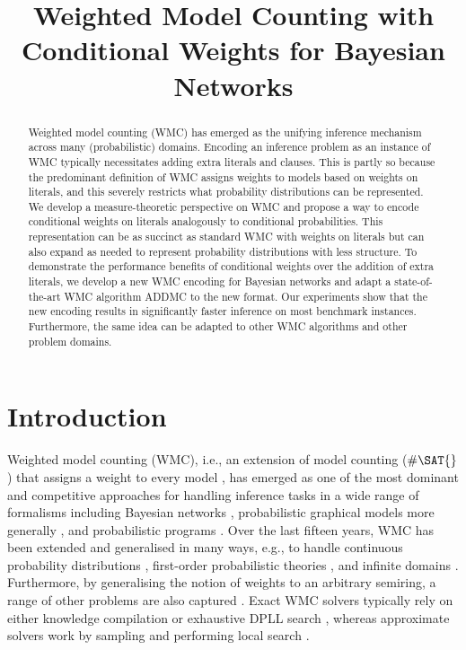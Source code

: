 \documentclass{article}
\title{Weighted Model Counting with Conditional Weights for Bayesian Networks}
\begin{document}
\maketitle

\begin{abstract}
  Weighted model counting (WMC) has emerged as the unifying inference mechanism
  across many (probabilistic) domains. Encoding an inference problem as an
  instance of WMC typically necessitates adding extra literals and clauses. This
  is partly so because the predominant definition of WMC assigns weights to
  models based on weights on literals, and this severely restricts what
  probability distributions can be represented. We develop a measure-theoretic
  perspective on WMC and propose a way to encode conditional weights on literals
  analogously to conditional probabilities. This representation can be as
  succinct as standard WMC with weights on literals but can also expand as
  needed to represent probability distributions with less structure. To
  demonstrate the performance benefits of conditional weights over the addition
  of extra literals, we develop a new WMC encoding for Bayesian networks and
  adapt a state-of-the-art WMC algorithm ADDMC to the new format. Our
  experiments show that the new encoding results in significantly faster
  inference on most benchmark instances. Furthermore, the same idea can be
  adapted to other WMC algorithms and other problem domains.
\end{abstract}

\section{Introduction}

Weighted model counting (WMC), i.e., an extension of model counting ($\#\SAT{}$)
that assigns a weight to every model \cite{DBLP:conf/aaai/SangBK05}, has emerged
as one of the most dominant and competitive approaches for handling inference
tasks in a wide range of formalisms including Bayesian networks
\cite{DBLP:conf/aaai/SangBK05,DBLP:books/daglib/0024906}, probabilistic
graphical models more generally \cite{DBLP:conf/ecsqaru/ChoiKD13}, and
probabilistic programs
\cite{DBLP:journals/tplp/FierensBRSGTJR15,DBLP:journals/corr/abs-2005-09089}.
Over the last fifteen years, WMC has been extended and generalised in many ways,
e.g., to handle continuous probability distributions
\cite{DBLP:conf/ijcai/BellePB15}, first-order probabilistic theories
\cite{DBLP:conf/ijcai/BroeckTMDR11,DBLP:journals/cacm/GogateD16}, and infinite
domains \cite{DBLP:conf/aaai/Belle17}. Furthermore, by generalising the notion
of weights to an arbitrary semiring, a range of other problems are also captured
\cite{DBLP:journals/japll/KimmigBR17}. Exact WMC solvers typically rely on
either knowledge compilation
\cite{DBLP:conf/ijcai/OztokD15,DBLP:conf/ijcai/LagniezM17} or exhaustive DPLL
search \cite{DBLP:conf/aaai/SangBK05}, whereas approximate solvers work by
sampling \cite{DBLP:conf/aaai/ChakrabortyFMSV14} and performing local search
\cite{DBLP:conf/sat/WeiS05}.
\end{document}
